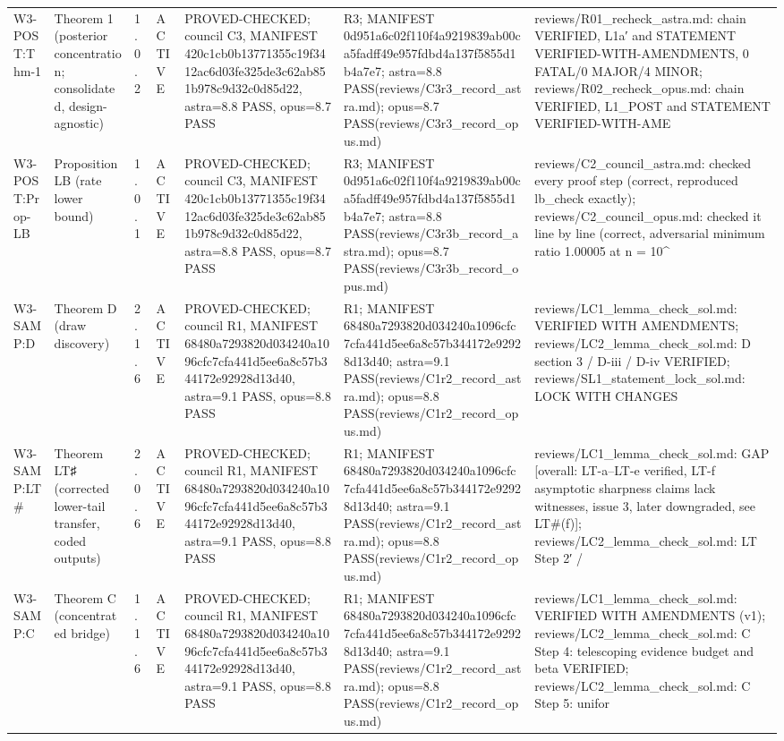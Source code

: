 \begin{longtable}{p{2.2cm}p{2.2cm}p{0.7cm}p{1.2cm}p{3.2cm}p{1.8cm}p{3cm}}
W3-POST:Thm-1 & Theorem 1 (posterior concentration; consolidated, design-agnostic) & 1.0.2 & ACTIVE & PROVED-CHECKED; council C3, MANIFEST 420c1cb0b13771355c19f3412ac6d03fe325de3c62ab851b978c9d32c0d85d22, astra=8.8 PASS, opus=8.7 PASS & R3; MANIFEST 0d951a6c02f110f4a9219839ab00ca5fadff49e957fdbd4a137f5855d1b4a7e7; astra=8.8 PASS(reviews/C3r3\_record\_astra.md); opus=8.7 PASS(reviews/C3r3\_record\_opus.md) & reviews/R01\_recheck\_astra.md: chain VERIFIED, L1a′ and STATEMENT VERIFIED-WITH-AMENDMENTS, 0 FATAL/0 MAJOR/4 MINOR; reviews/R02\_recheck\_opus.md: chain VERIFIED, L1\_POST and STATEMENT VERIFIED-WITH-AME \\
W3-POST:Prop-LB & Proposition LB (rate lower bound) & 1.0.1 & ACTIVE & PROVED-CHECKED; council C3, MANIFEST 420c1cb0b13771355c19f3412ac6d03fe325de3c62ab851b978c9d32c0d85d22, astra=8.8 PASS, opus=8.7 PASS & R3; MANIFEST 0d951a6c02f110f4a9219839ab00ca5fadff49e957fdbd4a137f5855d1b4a7e7; astra=8.8 PASS(reviews/C3r3b\_record\_astra.md); opus=8.7 PASS(reviews/C3r3b\_record\_opus.md) & reviews/C2\_council\_astra.md: checked every proof step (correct, reproduced lb\_check exactly); reviews/C2\_council\_opus.md: checked it line by line (correct, adversarial minimum ratio 1.00005 at n = 10\^{} \\
W3-SAMP:D & Theorem D (draw discovery) & 2.1.6 & ACTIVE & PROVED-CHECKED; council R1, MANIFEST 68480a7293820d034240a1096cfc7cfa441d5ee6a8c57b344172e92928d13d40, astra=9.1 PASS, opus=8.8 PASS & R1; MANIFEST 68480a7293820d034240a1096cfc7cfa441d5ee6a8c57b344172e92928d13d40; astra=9.1 PASS(reviews/C1r2\_record\_astra.md); opus=8.8 PASS(reviews/C1r2\_record\_opus.md) & reviews/LC1\_lemma\_check\_sol.md: VERIFIED WITH AMENDMENTS; reviews/LC2\_lemma\_check\_sol.md: D section 3 / D-iii / D-iv VERIFIED; reviews/SL1\_statement\_lock\_sol.md: LOCK WITH CHANGES \\
W3-SAMP:LT\# & Theorem LT♯ (corrected lower-tail transfer, coded outputs) & 2.0.6 & ACTIVE & PROVED-CHECKED; council R1, MANIFEST 68480a7293820d034240a1096cfc7cfa441d5ee6a8c57b344172e92928d13d40, astra=9.1 PASS, opus=8.8 PASS & R1; MANIFEST 68480a7293820d034240a1096cfc7cfa441d5ee6a8c57b344172e92928d13d40; astra=9.1 PASS(reviews/C1r2\_record\_astra.md); opus=8.8 PASS(reviews/C1r2\_record\_opus.md) & reviews/LC1\_lemma\_check\_sol.md: GAP [overall: LT-a–LT-e verified, LT-f asymptotic sharpness claims lack witnesses, issue 3, later downgraded, see LT\#(f)]; reviews/LC2\_lemma\_check\_sol.md: LT Step 2′ /  \\
W3-SAMP:C & Theorem C (concentrated bridge) & 1.1.6 & ACTIVE & PROVED-CHECKED; council R1, MANIFEST 68480a7293820d034240a1096cfc7cfa441d5ee6a8c57b344172e92928d13d40, astra=9.1 PASS, opus=8.8 PASS & R1; MANIFEST 68480a7293820d034240a1096cfc7cfa441d5ee6a8c57b344172e92928d13d40; astra=9.1 PASS(reviews/C1r2\_record\_astra.md); opus=8.8 PASS(reviews/C1r2\_record\_opus.md) & reviews/LC1\_lemma\_check\_sol.md: VERIFIED WITH AMENDMENTS (v1); reviews/LC2\_lemma\_check\_sol.md: C Step 4: telescoping evidence budget and beta VERIFIED; reviews/LC2\_lemma\_check\_sol.md: C Step 5: unifor \\

\end{longtable}
